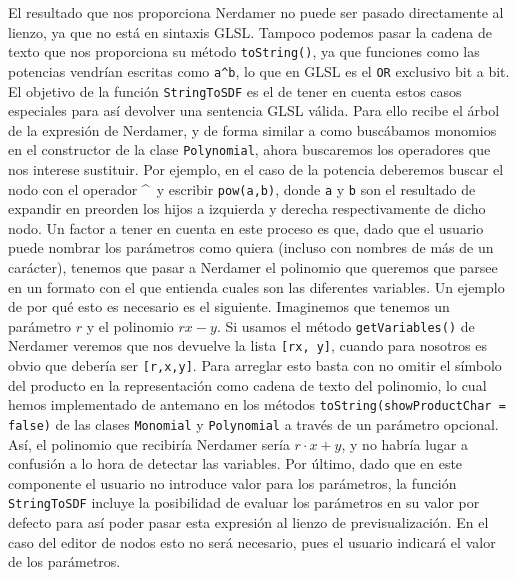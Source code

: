 El resultado que nos proporciona Nerdamer no puede ser pasado directamente al lienzo, ya que no está en sintaxis GLSL. Tampoco podemos pasar la cadena de texto que nos proporciona su método \texttt{toString()}, ya que funciones como las potencias vendrían escritas como \texttt{a\textasciicircum b}, lo que en GLSL es el \texttt{OR} exclusivo bit a bit. El objetivo de la función \texttt{StringToSDF} es el de tener en cuenta estos casos especiales para así devolver una sentencia GLSL válida. Para ello recibe el árbol de la expresión de Nerdamer, y de forma similar a como buscábamos monomios en el constructor de la clase \texttt{Polynomial}, ahora buscaremos los operadores que nos interese sustituir. Por ejemplo, en el caso de la potencia deberemos buscar el nodo con el operador \textasciicircum\ y escribir \texttt{pow(a,b)}, donde \texttt{a} y \texttt{b} son el resultado de expandir en preorden los hijos a izquierda y derecha respectivamente de dicho nodo. Un factor a tener en cuenta en este proceso es que, dado que el usuario puede nombrar los parámetros como quiera (incluso con nombres de más de un carácter), tenemos que pasar a Nerdamer el polinomio que queremos que parsee en un formato con el que entienda cuales son las diferentes variables. Un ejemplo de por qué esto es necesario es el siguiente. Imaginemos que tenemos un parámetro $r$ y el polinomio $rx -y$. Si usamos el método \texttt{getVariables()} de Nerdamer veremos que nos devuelve la lista \texttt{[rx, y]}, cuando para nosotros es obvio que debería ser \texttt{[r,x,y]}. Para arreglar esto basta con no omitir el símbolo del producto en la representación como cadena de texto del polinomio, lo cual hemos implementado de antemano en los métodos \texttt{toString(showProductChar = false)} de las clases \texttt{Monomial} y \texttt{Polynomial} a través de un parámetro opcional. Así, el polinomio que recibiría Nerdamer sería $r\cdot x + y$, y no habría lugar a confusión a lo hora de detectar las variables. Por último, dado que en este componente el usuario no introduce valor para los parámetros, la función \texttt{StringToSDF} incluye la posibilidad de evaluar los parámetros en su valor por defecto para así poder pasar esta expresión al lienzo de previsualización. En el caso del editor de nodos esto no será necesario, pues el usuario indicará el valor de los parámetros.\newline

